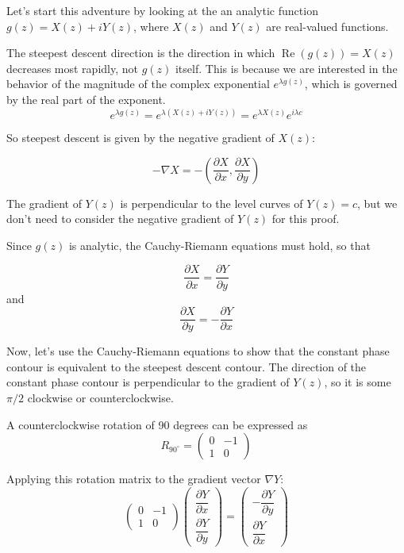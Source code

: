 
Let's start this adventure by looking at the an analytic function $g(z) = X(z) + iY(z)$,
where $X(z)$ and $Y(z)$ are real-valued functions.


The steepest descent direction is the direction in which $\operatorname{Re}(g(z)) = X(z)$
decreases most rapidly, not $g(z)$ itself.
This is because we are interested in the behavior of the magnitude of the complex exponential
$e^{\lambda g(z)}$, which is governed by the real part of the exponent.
$$
e^{\lambda g(z)} = e^{\lambda (X(z) + iY(z))} = e^{\lambda X(z)} e^{i\lambda c}
$$

So steepest descent is given by the negative gradient of $X(z)$:

$$
-\nabla X = -\left(\frac{\partial X}{\partial x}, \frac{\partial X}{\partial y}\right)
$$


The gradient of $Y(z)$ is perpendicular to the level curves of $Y(z) = c$,
but we don't need to consider the negative gradient of $Y(z)$ for this proof.



Since $g(z)$ is analytic, the Cauchy-Riemann equations must hold, so that

$$
\frac{\partial X}{\partial x} = \frac{\partial Y}{\partial y}
$$
and
$$
\frac{\partial X}{\partial y} = -\frac{\partial Y}{\partial x}
$$


Now, let's use the Cauchy-Riemann equations to show that the constant phase contour is equivalent
to the steepest descent contour.
The direction of the constant phase contour is perpendicular to the gradient of $Y(z)$, so it is
some $\pi/2$ clockwise or counterclockwise.

A counterclockwise rotation of 90 degrees can be expressed as
$$
R_{90^\circ}
= \begin{pmatrix}
    0 &  -1 \\
    1 & 0
\end{pmatrix}
$$

Applying this rotation matrix to the gradient vector $\nabla Y$:
$$
\begin{pmatrix}
    0 & -1 \\[1em]
    1 & 0
\end{pmatrix}
\begin{pmatrix}
    \dfrac{\partial Y}{\partial x} \\[1em]
    \dfrac{\partial Y}{\partial y}
\end{pmatrix}
= \begin{pmatrix}
    -\dfrac{\partial Y}{\partial y} \\[1em]
    \dfrac{\partial Y}{\partial x}
\end{pmatrix}
$$

